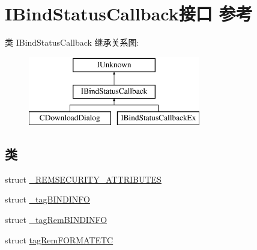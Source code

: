 \hypertarget{interface_i_bind_status_callback}{}\section{I\+Bind\+Status\+Callback接口 参考}
\label{interface_i_bind_status_callback}
类 I\+Bind\+Status\+Callback 继承关系图\+:\begin{figure}[H]
\begin{center}
\leavevmode
\includegraphics[height=3.000000cm]{interface_i_bind_status_callback}
\end{center}
\end{figure}
\subsection*{类}
\begin{DoxyCompactItemize}
\item 
struct \hyperlink{struct_i_bind_status_callback_1_1___r_e_m_s_e_c_u_r_i_t_y___a_t_t_r_i_b_u_t_e_s}{\+\_\+\+R\+E\+M\+S\+E\+C\+U\+R\+I\+T\+Y\+\_\+\+A\+T\+T\+R\+I\+B\+U\+T\+ES}
\item 
struct \hyperlink{struct_i_bind_status_callback_1_1__tag_b_i_n_d_i_n_f_o}{\+\_\+tag\+B\+I\+N\+D\+I\+N\+FO}
\item 
struct \hyperlink{struct_i_bind_status_callback_1_1__tag_rem_b_i_n_d_i_n_f_o}{\+\_\+tag\+Rem\+B\+I\+N\+D\+I\+N\+FO}
\item 
struct \hyperlink{struct_i_bind_status_callback_1_1tag_rem_f_o_r_m_a_t_e_t_c}{tag\+Rem\+F\+O\+R\+M\+A\+T\+E\+TC}
\end{DoxyCompactItemize}
